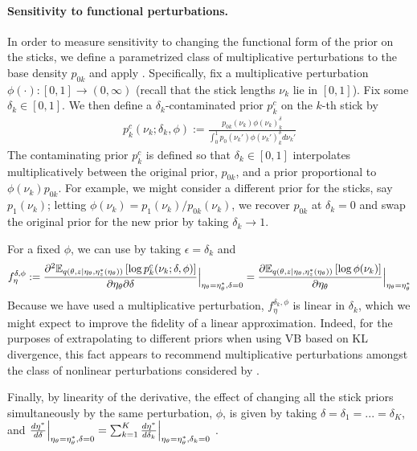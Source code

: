 

\paragraph{Sensitivity to functional perturbations.}
%
In order to measure sensitivity to changing the functional form of the prior on
the sticks, we define a parametrized class of multiplicative perturbations to
the base density $p_{0k}$ and apply .
Specifically, fix a multiplicative perturbation $\phi(\cdot): [0, 1] \rightarrow
(0, \infty)$ (recall that the stick lengths $\nu_k$  lie in $[0, 1]$). Fix some
$\delta_k\in[0, 1]$.  We then define a $\delta_k$-contaminated prior $p^c_{k}$ on
the $k$-th stick by
%
\begin{align}
\label{eq:expon_perturb}
	p^c_{k}(\nu_k ; \delta_k, \phi) :=
  \frac{p_{0k}(\nu_k)\phi(\nu_k)^\delta_k}
       {\int_0^1 p_0(\nu_k')\phi(\nu_k')^\delta_k d\nu_k'}
\end{align}
%
The contaminating prior $p^c_{k}$ is defined so that $\delta_k\in[0, 1]$
interpolates multiplicatively between the original prior, $p_{0k}$, and a prior
proportional to $\phi(\nu_k)p_{0k}$. For example, we might consider a different
prior for the sticks, say $p_1(\nu_k)$; letting $\phi(\nu_k) = p_1(\nu_k) /
p_{0k}(\nu_k)$, we recover $p_{0k}$ at $\delta_k = 0$ and swap the original
prior for the new prior by taking $\delta_k \rightarrow 1$.

For a fixed $\phi$, we can use  by taking
$\epsilon = \delta_k$ and
%
\begin{align*}
f^{\delta,\phi}_\eta :=
\frac{\partial^2
    \mathbb{E}_{q\left(\theta, z \vert \eta_\theta, \eta_z^{*}(\eta_\theta)\right)} \left[ \log p^c_{k}(\nu_k ; \delta, \phi) \right]}
{\partial \eta_\theta \partial \delta}
    \Big\rvert_{\eta_\theta = \eta_\theta^{*}, \delta = 0} =
\frac{\partial
    \mathbb{E}_{q\left(\theta, z \vert \eta_\theta, \eta_z^{*}(\eta_\theta)\right)} \left[ \log\phi(\nu_k) \right]}
{\partial \eta_\theta}
    \Big\rvert_{\eta_\theta = \eta_\theta^{*}}
\end{align*}
%
Because we have used a multiplicative perturbation, $f^{\delta_k, \phi}_\eta$
is linear in $\delta_k$, which we might expect to improve the fidelity of a
linear approximation.
%
Indeed, for the purposes of extrapolating to different priors
when using VB based on KL divergence, this
fact appears to recommend multiplicative perturbations amongst the class of
nonlinear perturbations considered by \citet{gustafson:1996:localposterior}.

Finally, by linearity of the derivative, the effect of changing all the stick
priors simultaneously by the same perturbation, $\phi$, is given by taking
$\delta = \delta_1 = ... = \delta_K$, and
$\frac{d\eta^{*}}{d\delta} \Big\rvert_{\eta_\theta = \eta_\theta^{*}, \delta=0} =
    \sum_{k=1}^{K} \frac{d\eta^{*}}{d\delta_k}
    \Big\rvert_{\eta_\theta = \eta_\theta^{*}, \delta_k=0}$
\citep{gustafson:1996:localmarginals}.
